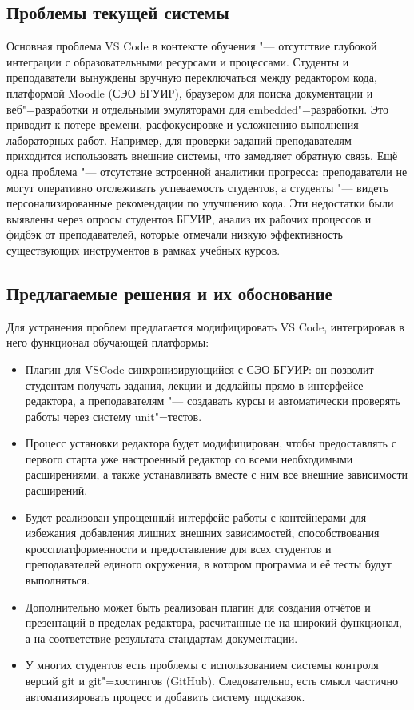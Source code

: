\documentclass{bsuir}
\begin{document}
\subsection{Проблемы текущей системы}

Основная проблема VS Code в контексте обучения "--- отсутствие глубокой
интеграции с образовательными ресурсами и процессами. Студенты и преподаватели
вынуждены вручную переключаться между редактором кода, платформой Moodle (СЭО
БГУИР), браузером для поиска документации и веб"=разработки и отдельными
эмуляторами для embedded"=разработки. Это приводит к потере времени,
расфокусировке и усложнению выполнения лабораторных работ. Например, для
проверки заданий преподавателям приходится использовать внешние системы, что
замедляет обратную связь. Ещё одна проблема "--- отсутствие встроенной аналитики
прогресса: преподаватели не могут оперативно отслеживать успеваемость студентов,
а студенты "--- видеть персонализированные рекомендации по улучшению кода. Эти
недостатки были выявлены через опросы студентов БГУИР, анализ их рабочих
процессов и фидбэк от преподавателей, которые отмечали низкую эффективность
существующих инструментов в рамках учебных курсов.

\subsection{Предлагаемые решения и их обоснование}

Для устранения проблем предлагается модифицировать VS Code, интегрировав в него
функционал обучающей платформы:

\begin{itemize}
	\item
	      Плагин для VSCode синхронизирующийся с СЭО БГУИР: он позволит
	      студентам получать задания, лекции и дедлайны прямо в интерфейсе
	      редактора, а преподавателям "--- создавать курсы и автоматически
	      проверять работы через систему unit"=тестов.
	\item
	      Процесс установки редактора будет модифицирован, чтобы предоставлять
	      с первого старта уже настроенный редактор со всеми необходимыми
	      расширениями, а также устанавливать вместе с ним все внешние
	      зависимости расширений.
	\item
	      Будет реализован упрощенный интерфейс работы с контейнерами для
	      избежания добавления лишних внешних зависимостей, способствования
	      кроссплатформенности и предоставление для всех студентов и
	      преподавателей единого окружения, в котором программа и её тесты
	      будут выполняться.
	\item
	      Дополнительно может быть реализован плагин для создания отчётов и
	      презентаций в пределах редактора, расчитанные не на широкий
	      функционал, а на соответствие результата стандартам документации.
	\item
	      У многих студентов есть проблемы с использованием системы контроля
	      версий git и git"=хостингов (GitHub). Следовательно, есть смысл
	      частично автоматизировать процесс и добавить систему подсказок.
\end{itemize}
\end{document}

